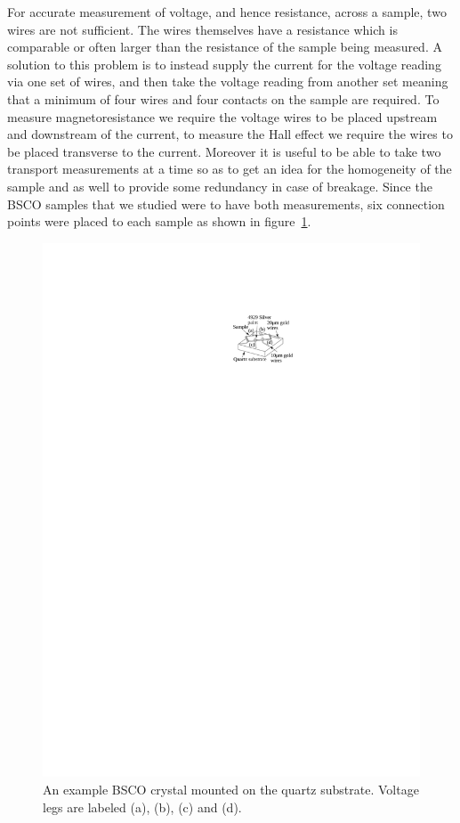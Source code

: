 For accurate measurement of voltage, and hence resistance, across a sample, two wires are not sufficient. The wires themselves have a resistance which is comparable or often larger than the resistance of the sample being measured. A solution to this problem is to instead supply the current for the voltage reading via one set of wires, and then take the voltage reading from another set meaning that a minimum of four wires and four contacts on the sample are required. To measure magnetoresistance we require the voltage wires to be placed upstream and downstream of the current, to measure the Hall effect we require the wires to be placed transverse to the current. Moreover it is useful to be able to take two transport measurements at a time so as to get an idea for the homogeneity of the sample and as well to provide some redundancy in case of breakage. Since the \ac{BSCO} samples that we studied were to have both measurements, six connection points were placed to each sample as shown in figure~\ref{Fig:Exp:BSCOSampleSchematic}.
\begin{figure}[htbp]
    \begin{center}
        \includegraphics[scale=0.9]{Chapter-ExperimentalTechnique/Figures/BSCOSampleSchematic/BSCOSampleSchematic}
        \caption{An example \ac{BSCO} crystal mounted on the quartz substrate. Voltage legs are labeled (a), (b), (c) and (d).}
        \label{Fig:Exp:BSCOSampleSchematic}
    \end{center}
\end{figure}
